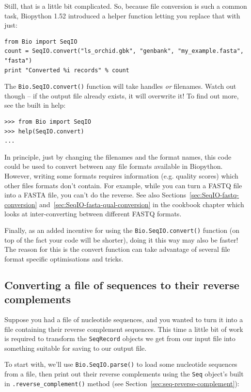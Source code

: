 \documentclass{report}
\begin{document}
Still, that is a little bit complicated. So, because file conversion is such a
common task, Biopython 1.52 introduced a helper function letting you replace
that with just:

\begin{verbatim}
from Bio import SeqIO
count = SeqIO.convert("ls_orchid.gbk", "genbank", "my_example.fasta", "fasta")
print "Converted %i records" % count
\end{verbatim}

The \verb|Bio.SeqIO.convert()| function will take handles \emph{or} filenames.
Watch out though -- if the output file already exists, it will overwrite it!
To find out more, see the built in help:

\begin{verbatim}
>>> from Bio import SeqIO
>>> help(SeqIO.convert)
...
\end{verbatim}

In principle, just by changing the filenames and the format names, this code
could be used to convert between any file formats available in Biopython.
However, writing some formats requires information (e.g. quality scores) which
other files formats don't contain. For example, while you can turn a FASTQ
file into a FASTA file, you can't do the reverse. See also
Sections~\ref{sec:SeqIO-fastq-conversion} and~\ref{sec:SeqIO-fasta-qual-conversion}
in the cookbook chapter which looks at inter-converting between different FASTQ formats.

Finally, as an added incentive for using the \verb|Bio.SeqIO.convert()| function
(on top of the fact your code will be shorter), doing it this way may also be
faster! The reason for this is the convert function can take advantage of
several file format specific optimisations and tricks.

\subsection{Converting a file of sequences to their reverse complements}
\label{sec:SeqIO-reverse-complement}
Suppose you had a file of nucleotide sequences, and you wanted to turn it into a file containing their reverse complement sequences.  This time a little bit of work is required to transform the \verb|SeqRecord| objects we get from our input file into something suitable for saving to our output file.

To start with, we'll use \verb|Bio.SeqIO.parse()| to load some nucleotide
sequences from a file, then print out their reverse complements using
the \verb|Seq| object's built in \verb|.reverse_complement()| method (see Section~\ref{sec:seq-reverse-complement}):
\end{document}

